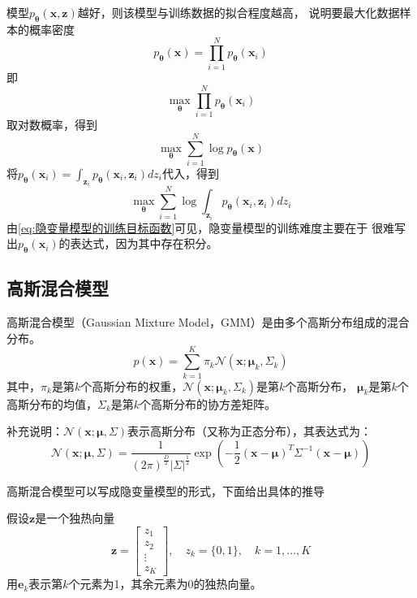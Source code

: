 \documentclass[withoutpreface,bwprint]{NoteBook}
\begin{document}
模型$p_{\mathbf{\theta}}({\mathbf{x},\mathbf{z}})$越好，则该模型与训练数据的拟合程度越高，
说明要最大化数据样本的概率密度
$$
p_{\mathbf{\theta}}({\mathbf{x}}) = \prod_{i=1}^{N} p_{\mathbf{\theta}}({\mathbf{x}_i})
$$
即 
$$
\max_{\mathbf{\theta}} \prod_{i=1}^{N} p_{\mathbf{\theta}}({\mathbf{x}_i})
$$
取对数概率，得到
$$
\max_{\mathbf{\theta}} \sum_{i=1}^{N} \log p_{\mathbf{\theta}}({\mathbf{x}})
$$
将$ p_{\mathbf{\theta}}({\mathbf{x}_i}) = \int_{\mathbf{z}_i} p_{\mathbf{\theta}}({\mathbf{x}_i,\mathbf{z}_i}) dz_i$代入，得到
\begin{equation}
    \label{eq:隐变量模型的训练目标函数}
    \max_{\mathbf{\theta}} \sum_{i=1}^{N} \log \int_{\mathbf{z}_i} p_{\mathbf{\theta}}({\mathbf{x}_i,\mathbf{z}_i}) dz_i
\end{equation}
由\cref{eq:隐变量模型的训练目标函数}可见，隐变量模型的训练难度主要在于
很难写出$ p_{\mathbf{\theta}}({\mathbf{x}_i})$的表达式，因为其中存在积分。


\subsection{高斯混合模型}
高斯混合模型（Gaussian Mixture Model，GMM）是由多个高斯分布组成的混合分布。
\begin{equation}
    \label{eq:高斯混合模型}
    p(\mathbf{x}) = \sum_{k=1}^K \pi_k \mathcal{N}(\mathbf{x};\bm{\mu}_k,\Sigma_k)
\end{equation}
其中，$\pi_k$是第$k$个高斯分布的权重，$\mathcal{N}(\mathbf{x};\bm{\mu}_k,\Sigma_k)$是第$k$个高斯分布，
$\bm{\mu}_k$是第$k$个高斯分布的均值，$\Sigma_k$是第$k$个高斯分布的协方差矩阵。

补充说明：$\mathcal{N}(\mathbf{x};\bm{\mu},\Sigma) $表示高斯分布（又称为正态分布），其表达式为：
\begin{equation}
    \label{eq:高斯分布}
    \mathcal{N}(\mathbf{x};\bm{\mu},\Sigma) = 
    \frac{1}{(2\pi)^{\frac{D}{2}} \left |{\Sigma}\right |^{\frac{1}{2}}} \exp\left(-\frac{1}{2}(\mathbf{x}-\bm{\mu})^T\Sigma^{-1}(\mathbf{x}-\bm{\mu})\right)
\end{equation}

高斯混合模型可以写成隐变量模型的形式，下面给出具体的推导

假设$\mathbf{z}$是一个独热向量
$$
\mathbf{z} = 
\begin{bmatrix}
    z_1\\ z_2 \\ \vdots \\ z_K
\end{bmatrix},
\quad
z_k = \{0, 1\},
\quad
k = 1,\dots,K
$$
用$\mathbf{e}_k$表示第$k$个元素为1，其余元素为0的独热向量。
\end{document}

